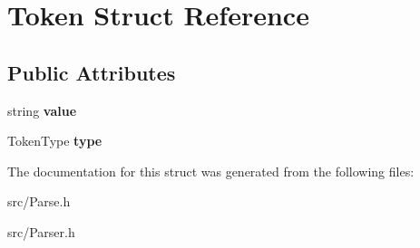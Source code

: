 \hypertarget{struct_token}{\section{Token Struct Reference}
\label{struct_token}
}
\subsection*{Public Attributes}
\begin{DoxyCompactItemize}
\item 
\hypertarget{struct_token_a2aba86042caecc62787c3ad63682f5c7}{string {\bfseries value}}\label{struct_token_a2aba86042caecc62787c3ad63682f5c7}

\item 
\hypertarget{struct_token_a67919af9f3a80dc0b28a0ab1e6d5bf8a}{Token\-Type {\bfseries type}}\label{struct_token_a67919af9f3a80dc0b28a0ab1e6d5bf8a}

\end{DoxyCompactItemize}


The documentation for this struct was generated from the following files\-:\begin{DoxyCompactItemize}
\item 
src/Parse.\-h\item 
src/Parser.\-h\end{DoxyCompactItemize}
